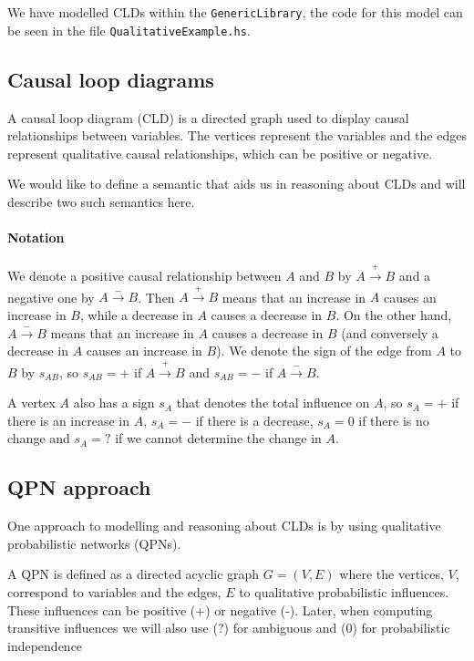 \documentclass[]{article}
\begin{document}
We have modelled CLDs within the \verb|GenericLibrary|, the code for this model
can be seen in the file \verb|QualitativeExample.hs|. \\

\subsection{Causal loop diagrams}

A causal loop diagram (CLD) is a directed graph used to display causal
relationships between variables.
%
The vertices represent the variables and the edges represent qualitative
causal relationships, which can be positive or negative.

We would like to define a semantic that aids us in reasoning about CLDs and will
describe two such semantics here.

\paragraph{Notation}
We denote a positive causal relationship between $A$ and $B$ by
$A\xrightarrow{+} B$ and a negative one by $A \xrightarrow{-} B$.
%
Then $A \xrightarrow{+} B$ means that an increase in $A$ causes an
increase in $B$, while a decrease in $A$ causes a decrease in $B$.
%
On the other hand, $A\xrightarrow{-} B$ means that an increase in $A$
causes a decrease in $B$ (and conversely a decrease in $A$ causes an
increase in $B$).
%
We denote the sign of the edge from $A$ to $B$ by $s_{AB}$, so
$s_{AB}= +$ if $A\xrightarrow{+} B$ and $s_{AB}=-$ if
$A\xrightarrow{-} B$.

A vertex $A$ also has a sign $s_A$ that denotes the total influence on $A$, so
$s_A=+$ if there is an increase in $A$, $s_A=-$ if there is a decrease, $s_A=0$
if there is no change and $s_A=?$ if we cannot determine the change in $A$.

\subsection{QPN approach}

One approach to modelling and reasoning about CLDs is by using qualitative
probabilistic networks (QPNs).

A QPN is defined as a directed
acyclic graph $G=(V,E)$ where the vertices, $V$, correspond to
variables and the edges, $E$ to qualitative probabilistic influences.
%
These influences can be positive (+) or negative (-).
%
Later, when computing transitive influences we will also use (?) for
ambiguous and (0) for probabilistic independence
\end{document}
